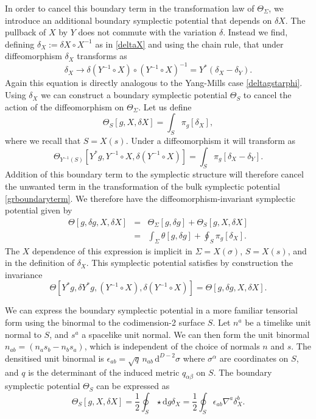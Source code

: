 \documentclass[a4paper,11pt]{article}
\newcommand{\be}{\begin{equation}}
\newcommand{\ee}{\end{equation}}
\newcommand{\bea}{\begin{eqnarray}}
\newcommand{\eea}{\end{eqnarray}}
\def\rd{\mathrm{d}}
\begin{document}
In order to cancel this boundary term in the transformation law of $\Theta_\Sigma$, we introduce an additional boundary symplectic potential that depends on $\delta X$.
The pullback of $X$ by $Y$ does not commute with the variation $\delta$.
Instead we find, defining $\delta_X := \delta X \circ X^{-1}$ as in  \eqref{deltaX} and using the chain rule, that under diffeomorphism $\delta_X$ transforms as
\begin{equation}
\delta_X \to \delta(Y^{-1} \circ X) \circ (Y^{-1} \circ X)^{-1} = Y^*( \delta_X - \delta_Y).
\end{equation}
Again this equation is directly analogous to the Yang-Mills case \eqref{deltagstarphi}.
Using $\delta_X$ we can construct a boundary symplectic potential $\Theta_S$ to cancel the action of the diffeomorphism on $\Theta_\Sigma$.
Let us define 
\begin{equation}
\Theta_S [g, X, \delta X] = 
\int_{S} \pi_g [\delta_X],
\end{equation}
where we recall that $S=X(s)$.
Under a diffeomorphism it will transform as 
\begin{equation}
\Theta_{Y^{-1}(S)}[Y^*g, Y^{-1} \circ X, \delta (Y^{-1} \circ X)] = \int_{S} \pi_g[\delta_X - \delta_Y].
\end{equation}
Addition of this boundary term to the symplectic structure will therefore cancel the unwanted term in the transformation of the bulk symplectic potential \eqref{grboundaryterm}.
We therefore have the diffeomorphism-invariant symplectic potential given by
\bea    
\Theta[g, \delta g, X, \delta X] &=& \Theta_{\Sigma} [g, \delta g] + \Theta_{S} [g, X, \delta X] \nonumber \\
&=& \int_{\Sigma} \theta[g, \delta g] + \oint_{S} \pi_g[\delta_X].
\eea
The $X$ dependence of this expression is implicit in $\Sigma=X(\sigma)$, $S= X(s)$, and in the definition of $\delta_X$.
This symplectic potential satisfies by construction the invariance
\be\label{diffinv}
\Theta[Y^*g, \delta Y^*g,  (Y^{-1} \circ X), \delta (Y^{-1} \circ X)]
=\Theta[g, \delta g,  X, \delta X].
\ee

We can express the boundary symplectic potential in a more familiar tensorial form using the binormal to the codimension-2 surface $S$.
Let $n^a$ be a timelike unit normal to $S$, and $s^a$ a spacelike unit normal.
We can then form the unit binormal $n_{ab} = (n_a s_b - n_b s_a)$, which is independent of the choice of normals $n$ and $s$.
The densitised unit binormal is $\epsilon_{ab} = \sqrt{q} \, n_{ab} \, \rd^{D-2}\sigma$ where $\sigma^\alpha$ are coordinates on $S$, and $q$ is the determinant of the induced metric $q_{\alpha \beta}$ on $S$.
The boundary symplectic potential $\Theta_S$ can be expressed as
\be
\Theta_{S} [g, X, \delta X] 
= \frac{1}{2} \oint_S \star \rd g \delta_X = \frac{1}{2} \oint_S \epsilon_{ab} \nabla^a \delta_X^b.
\ee
\end{document}
